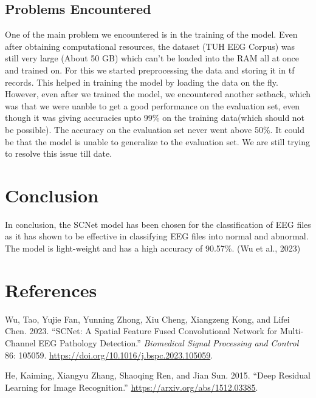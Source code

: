 \documentclass[10pt]{article}
\newlength{\cslhangindent}
\newlength{\cslentryspacingunit} %
\newenvironment{CSLReferences}[2] %
{%
    \setlength{\parindent}{0pt}
    \ifodd #1
        \let\oldpar\par
        \def\par{\hangindent=\cslhangindent\oldpar}
    \fi
    \setlength{\parskip}{#2\cslentryspacingunit}
}%
{}
\begin{document}
\subsection{Problems Encountered}
One of the main problem we encountered is in the training of the model. Even after obtaining computational resources, the dataset (TUH EEG Corpus) was still very large (About 50 GB) which can't be loaded into the RAM all at once and trained on. For this we started preprocessing the data and storing it in tf records. This helped in training the model by loading the data on the fly.
However, even after we trained the model, we encountered another setback, which was that we were uanble to get a good performance on the evaluation set, even though it was giving accuracies upto 99\% on the training data(which should not be possible). The accuracy on the evaluation set never went above 50\%. It could be that the model is unable to generalize to the evaluation set. We are still trying to resolve this issue till date.


\section{Conclusion}
In conclusion, the SCNet model has been chosen for the classification of EEG files as it has shown to be effective in classifying EEG files into normal and abnormal. The model is light-weight and has a high accuracy of 90.57\%. (Wu et al., 2023)

\section{References}
\hypertarget{refs}{}
\begin{CSLReferences}{1}{0}
    \leavevmode{}%
    Wu, Tao, Yujie Fan, Yunning Zhong, Xiu Cheng, Xiangzeng Kong, and Lifei
    Chen. 2023. {``SCNet: A Spatial Feature Fused Convolutional Network for
    Multi-Channel EEG Pathology Detection.''} \emph{Biomedical Signal
    Processing and Control} 86: 105059.
    \url{https://doi.org/10.1016/j.bspc.2023.105059}.

\end{CSLReferences}

\vspace{0.5cm}
\hypertarget{refs}{}
\begin{CSLReferences}{1}{0}
\leavevmode{}%
He, Kaiming, Xiangyu Zhang, Shaoqing Ren, and Jian Sun. 2015. {``Deep
Residual Learning for Image Recognition.''}
\url{https://arxiv.org/abs/1512.03385}.

\end{CSLReferences}
\end{document}
